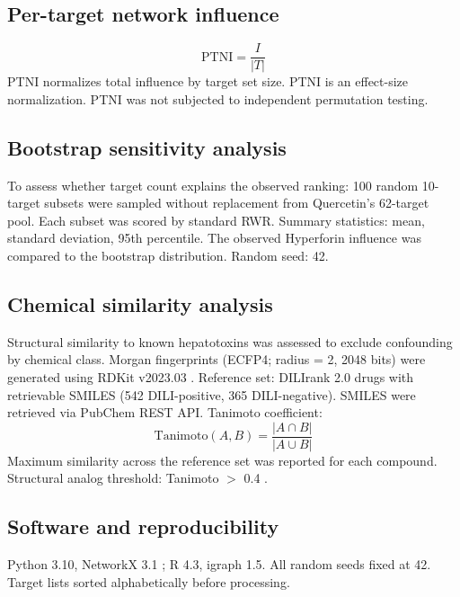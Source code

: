 \subsection{Per-target network influence}

\begin{equation}
    \text{PTNI} = \frac{I}{|T|}
\end{equation}
PTNI normalizes total influence by target set size.
PTNI is an effect-size normalization.
PTNI was not subjected to independent permutation testing.

\subsection{Bootstrap sensitivity analysis}

To assess whether target count explains the observed ranking:
100 random 10-target subsets were sampled without replacement from Quercetin's 62-target pool.
Each subset was scored by standard RWR.
Summary statistics: mean, standard deviation, 95th percentile.
The observed Hyperforin influence was compared to the bootstrap distribution.
Random seed: 42.

\subsection{Chemical similarity analysis}

Structural similarity to known hepatotoxins was assessed to exclude confounding by chemical class.
Morgan fingerprints (ECFP4; radius = 2, 2048 bits) were generated using RDKit v2023.03 \citep{RDKit2023}.
Reference set: DILIrank 2.0 drugs with retrievable SMILES (542 DILI-positive, 365 DILI-negative).
SMILES were retrieved via PubChem REST API.
Tanimoto coefficient:
\begin{equation}
    \text{Tanimoto}(A, B) = \frac{|A \cap B|}{|A \cup B|}
\end{equation}
Maximum similarity across the reference set was reported for each compound.
Structural analog threshold: Tanimoto $>$ 0.4 \citep{Maggiora2014}.

\subsection{Software and reproducibility}

Python 3.10, NetworkX 3.1 \citep{Hagberg2008}; R 4.3, igraph 1.5.
All random seeds fixed at 42.
Target lists sorted alphabetically before processing.

